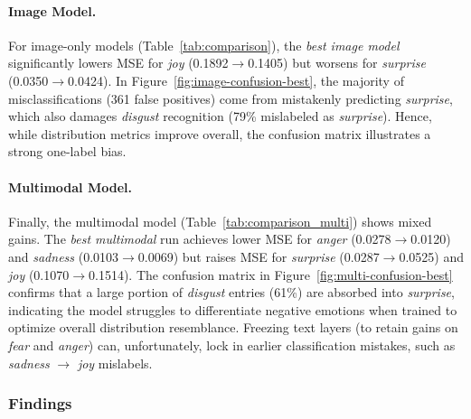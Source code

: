 \paragraph{Image Model.} 
For image-only models (Table~\ref{tab:comparison}), the \emph{best image model} significantly lowers MSE for \emph{joy} (0.1892$\rightarrow$0.1405) but worsens for \emph{surprise} (0.0350$\rightarrow$0.0424). In Figure~\ref{fig:image-confusion-best}, the majority of misclassifications (361 false positives) come from mistakenly predicting \emph{surprise}, which also damages \emph{disgust} recognition (79\% mislabeled as \emph{surprise}). Hence, while distribution metrics improve overall, the confusion matrix illustrates a strong one-label bias.

\paragraph{Multimodal Model.}
Finally, the multimodal model (Table~\ref{tab:comparison_multi}) shows mixed gains. The \emph{best multimodal} run achieves lower MSE for \emph{anger} (0.0278$\rightarrow$0.0120) and \emph{sadness} (0.0103$\rightarrow$0.0069) but raises MSE for \emph{surprise} (0.0287$\rightarrow$0.0525) and \emph{joy} (0.1070$\rightarrow$0.1514). The confusion matrix in Figure~\ref{fig:multi-confusion-best} confirms that a large portion of \emph{disgust} entries (61\%) are absorbed into \emph{surprise}, indicating the model struggles to differentiate negative emotions when trained to optimize overall distribution resemblance. Freezing text layers (to retain gains on \emph{fear} and \emph{anger}) can, unfortunately, lock in earlier classification mistakes, such as \emph{sadness} $\rightarrow$ \emph{joy} mislabels.

\subsubsection{Findings}

